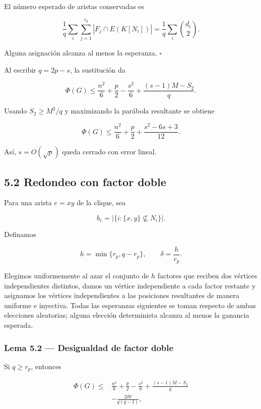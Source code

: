 \documentclass[
  11pt,
]{article}
\begin{document}
El número esperado de aristas conservadas es

\[
\frac1q\sum_i\sum_{j=1}^{r_p}|F_j\cap E(K[N_i])|
=
\frac1q\sum_i\binom{d_i}{2}.
\]

Alguna asignación alcanza al menos la esperanza. \(\square\)

Al escribir \(q=2p-s\), la sustitución da

\[
\Phi(G)
\le
\frac{n^2}{6}+\frac p2-\frac{s^2}{6}
+
\frac{(s-1)M-S_2}{q}.
\tag{5.2}
\]

Usando \(S_2\ge M^2/q\) y maximizando la parábola resultante se obtiene

\[
\boxed{
\Phi(G)
\le
\frac{n^2}{6}+\frac p2+\frac{s^2-6s+3}{12}.
}
\tag{5.3}
\]

Así, \(s=O(\sqrt p)\) queda cerrado con error lineal.

\subsection{5.2 Redondeo con factor doble}\label{redondeo-con-factor-doble}

Para una arista \(e=xy\) de la clique, sea

\[
b_e=|\{i:\{x,y\}\not\subseteq N_i\}|.
\]

Definamos

\[
h=\min\{r_p,q-r_p\},
\qquad
\delta=\frac h{r_p}.
\]

Elegimos uniformemente al azar el conjunto de \(h\) factores que reciben dos vértices independientes distintos, damos un vértice independiente a cada factor restante y asignamos los vértices independientes a las posiciones resultantes de manera uniforme e inyectiva. Todas las esperanzas siguientes se toman respecto de ambas elecciones aleatorias; alguna elección determinista alcanza al menos la ganancia esperada.

\subsubsection{Lema 5.2 --- Desigualdad de factor doble}\label{lema-5.2-desigualdad-de-factor-doble}

Si \(q\ge r_p\), entonces

\[
\boxed{
\begin{aligned}
\Phi(G)
\le{}&
\frac{n^2}{6}+\frac p2-\frac{s^2}{6}
+
\frac{(s-1)M-S_2}{q}\\
&-
\frac{2\delta V}{q(q-1)},
\end{aligned}
}
\tag{5.4}
\]
\end{document}
